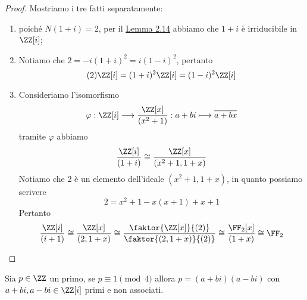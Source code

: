 \documentclass[11pt]{scrartcl}
\begin{document}
	\begin{proof}Mostriamo i tre fatti separatamente:
		\begin{enumerate}[(1)]
			\item poiché $N(1 + i) = 2$, per il \hyperref[lemma2.14]{Lemma 2.14} abbiamo 
			che $1 + i$ è irriducibile in $\ZZ[i]$;
			\item Notiamo che $2 = -i(1 + i)^2 = i(1 - i)^2$, pertanto 
			\[
			(2)\ZZ[i] = (1 + i)^2\ZZ[i] = (1 - i)^2\ZZ[i]
			\]
			\item Consideriamo l'isomorfismo 
			\[
			\varphi: \ZZ[i]\longrightarrow \frac{\ZZ[x]}{(x^2 + 1)}:
			a + bi \longmapsto \overline{a + bx}
			\]
			tramite $\varphi$ abbiamo
			\[
			\frac{\ZZ[i]}{(1 + i)} \cong \frac{\ZZ[x]}{(x^2 + 1, 1 + x)}
			\]
			Notiamo che 2 è un elemento dell'ideale $(x^2 + 1, 1 + x)$, in quanto 
			possiamo scrivere
			\[
			2 = x^2 + 1 - x(x + 1) + x + 1
			\]
			Pertanto
			\[
			\frac{\ZZ[i]}{(i + 1)} \cong \frac{\ZZ[x]}{(2, 1 + x)} \cong 
			\frac{\faktor{\ZZ[x]}{(2)}}{\faktor{(2, 1 + x)}{(2)}} \cong 
			\frac{\FF_2[x]}{(1 + x)} \cong \FF_2
			\]
		\end{enumerate}
	\end{proof}
	
	\begin{lemma}
		\label{lemma2.16}
		Sia $p \in \ZZ$ un primo, se $p \equiv 1 \pmod 4$ allora $p = (a + bi)(a - bi)$
		con $a + bi, a - bi \in \ZZ[i]$ primi e non associati.
	\end{lemma}
	
\end{document}
